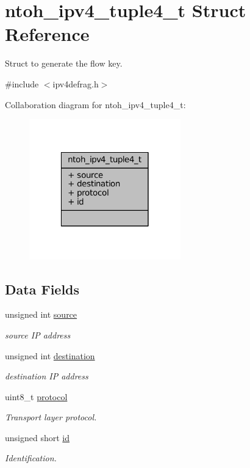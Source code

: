 \hypertarget{structntoh__ipv4__tuple4__t}{\section{ntoh\-\_\-ipv4\-\_\-tuple4\-\_\-t Struct Reference}
\label{structntoh__ipv4__tuple4__t}
}


Struct to generate the flow key.  




{\ttfamily \#include $<$ipv4defrag.\-h$>$}



Collaboration diagram for ntoh\-\_\-ipv4\-\_\-tuple4\-\_\-t\-:
\nopagebreak
\begin{figure}[H]
\begin{center}
\leavevmode
\includegraphics[width=186pt]{structntoh__ipv4__tuple4__t__coll__graph}
\end{center}
\end{figure}
\subsection*{Data Fields}
\begin{DoxyCompactItemize}
\item 
unsigned int \hyperlink{structntoh__ipv4__tuple4__t_a32ee136f9a3309d9f5aec70ddaebc420}{source}
\begin{DoxyCompactList}\small\item\em source I\-P address \end{DoxyCompactList}\item 
unsigned int \hyperlink{structntoh__ipv4__tuple4__t_aa2b73075fb6a7866116ece24e01ea950}{destination}
\begin{DoxyCompactList}\small\item\em destination I\-P address \end{DoxyCompactList}\item 
uint8\-\_\-t \hyperlink{structntoh__ipv4__tuple4__t_ad124d3d2e02c729afa303c775295278e}{protocol}
\begin{DoxyCompactList}\small\item\em Transport layer protocol. \end{DoxyCompactList}\item 
unsigned short \hyperlink{structntoh__ipv4__tuple4__t_a2e74aff868562e644e5d582929433363}{id}
\begin{DoxyCompactList}\small\item\em Identification. \end{DoxyCompactList}\end{DoxyCompactItemize}


